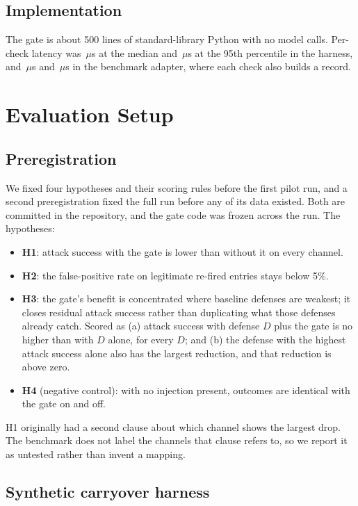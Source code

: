 \documentclass[conference]{IEEEtran}
\begin{document}
\subsection{Implementation}

The gate is about 500 lines of standard-library Python with no model calls. Per-check latency
was \harnessLatP{}\,$\mu$s at the median and \harnessLatQ{}\,$\mu$s at the 95th percentile in the
harness, and \benchLatP{}\,$\mu$s and \benchLatQ{}\,$\mu$s in the benchmark adapter, where each
check also builds a record.

\section{Evaluation Setup}
\label{sec:setup}

\subsection{Preregistration}

We fixed four hypotheses and their scoring rules before the first pilot run, and a second
preregistration fixed the full run before any of its data existed. Both are committed in the
repository, and the gate code was frozen across the run. The hypotheses:
\begin{itemize}
\item \textbf{H1}: attack success with the gate is lower than without it on every channel.
\item \textbf{H2}: the false-positive rate on legitimate re-fired entries stays below 5\%.
\item \textbf{H3}: the gate's benefit is concentrated where baseline defenses are weakest; it
closes residual attack success rather than duplicating what those defenses already catch.
Scored as (a) attack success with defense $D$ plus the gate is no higher than with $D$ alone,
for every $D$; and (b) the defense with the highest attack success alone also has the largest
reduction, and that reduction is above zero.
\item \textbf{H4} (negative control): with no injection present, outcomes are identical with
the gate on and off.
\end{itemize}
H1 originally had a second clause about which channel shows the largest drop. The benchmark does
not label the channels that clause refers to, so we report it as untested rather than invent a
mapping.

\subsection{Synthetic carryover harness}
\end{document}
